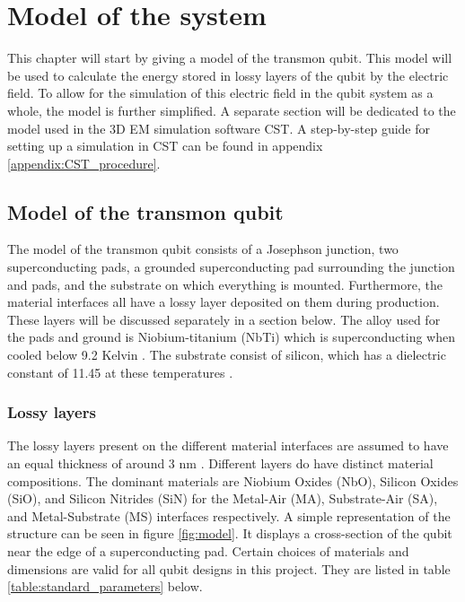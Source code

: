 \chapter{Model of the system}
This chapter will start by giving a model of the transmon qubit. This model will be used to calculate the energy stored in lossy layers of the qubit by the electric field. To allow for the simulation of this electric field in the qubit system as a whole, the model is further simplified. A separate section will be dedicated to the model used in the 3D EM simulation software CST. A step-by-step guide for setting up a simulation in CST can be found in appendix \ref{appendix:CST_procedure}.
 
\section{Model of the transmon qubit}
The model of the transmon qubit consists of a Josephson junction, two superconducting pads, a grounded superconducting pad surrounding the junction and pads, and the substrate on which everything is mounted. Furthermore, the material interfaces all have a lossy layer deposited on them during production. These layers will be discussed separately in a section below. The alloy used for the pads and ground is Niobium-titanium (NbTi) which is superconducting when cooled below 9.2 Kelvin \cite{LandoltBornstein1994}. The substrate consist of silicon, which has a dielectric constant of 11.45 at these temperatures . 

\subsection{Lossy layers}
The lossy layers present on the different material interfaces are assumed to have an equal thickness of around 3 nm \cite{Wenner2011}. Different layers do have distinct material compositions. The dominant materials are Niobium Oxides (NbO), Silicon Oxides (SiO), and Silicon Nitrides (SiN) for the Metal-Air (MA), Substrate-Air (SA), and Metal-Substrate (MS) interfaces respectively. A simple representation of the structure can be seen in figure \ref{fig:model}. It displays a cross-section of the qubit near the edge of a superconducting pad. Certain choices of materials and dimensions are valid for all qubit designs in this project. They are listed in table \ref{table:standard_parameters} below.

